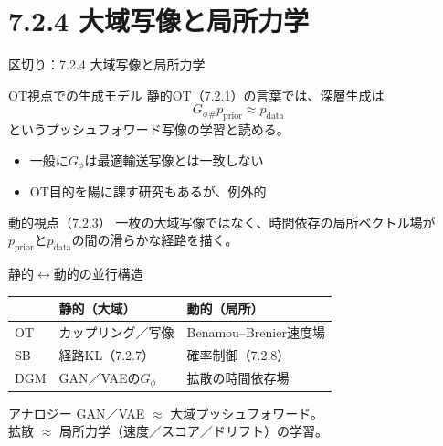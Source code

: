 \section{7.2.4 大域写像と局所力学}
\asmain
\begin{frame}{区切り：7.2.4 大域写像と局所力学}
    \tableofcontents[currentsection]
\end{frame}
\asmain
\begin{frame}{OT視点での生成モデル}
    静的OT（7.2.1）の言葉では、深層生成は
    \[
        G_{\phi}{}_{\#}p_{\mathrm{prior}}
        \approx
        p_{\mathrm{data}}
    \]
    というプッシュフォワード写像の学習と読める。
    \begin{itemize}
        \item 一般に$G_{\phi}$は最適輸送写像とは一致しない
        \item OT目的を陽に課す研究もあるが、例外的
    \end{itemize}
    \begin{block}{動的視点（7.2.3）}
        一枚の大域写像ではなく、時間依存の局所ベクトル場が\\
        $p_{\mathrm{prior}}$と$p_{\mathrm{data}}$の間の滑らかな経路を描く。
    \end{block}
\end{frame}
\asmain
\begin{frame}{静的$\leftrightarrow$動的の並行構造}
    \begin{center}
    \begin{tabular}{lll}
        \hline
        & 静的（大域） & 動的（局所） \\
        \hline
        OT & カップリング／写像 & Benamou--Brenier速度場 \\
        SB & 経路KL（7.2.7） & 確率制御（7.2.8） \\
        DGM & GAN／VAEの$G_{\phi}$ & 拡散の時間依存場 \\
        \hline
    \end{tabular}
    \end{center}
    \vspace{0.6em}
    \begin{exampleblock}{アナロジー}
        GAN／VAE $\approx$ 大域プッシュフォワード。\\
        拡散 $\approx$ 局所力学（速度／スコア／ドリフト）の学習。
    \end{exampleblock}
\end{frame}
